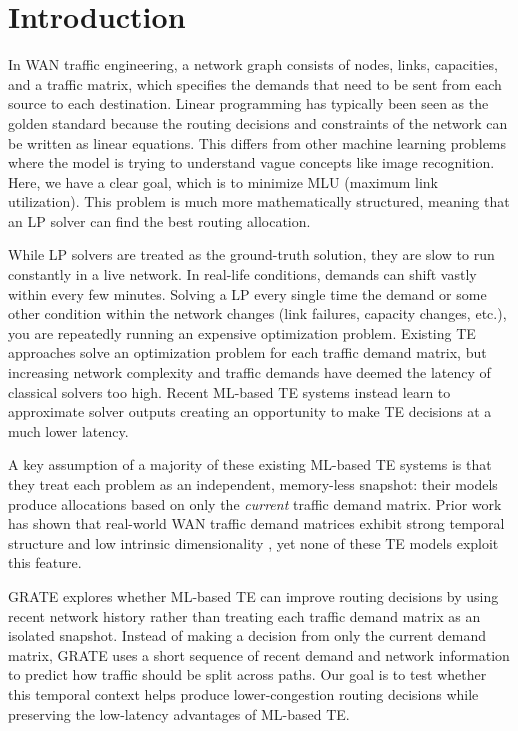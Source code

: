 \documentclass[letterpaper,twocolumn,10pt]{article}
\begin{document}
\section{Introduction}

In WAN traffic engineering, a network graph consists of nodes, links, capacities, and a traffic matrix, which specifies the demands that need to be sent from each source to each destination. Linear programming has typically been seen as the golden standard because the routing decisions and constraints of the network can be written as linear equations. This differs from other machine learning problems where the model is trying to understand vague concepts like image recognition. Here, we have a clear goal, which is to minimize MLU (maximum link utilization).  This problem is much more mathematically structured, meaning that an LP solver can find the best routing allocation. 

While LP solvers are treated as the ground-truth solution, they are slow to run constantly in a live network. In real-life conditions, demands can shift vastly within every few minutes. Solving a LP every single time the demand or some other condition within the network changes (link failures, capacity changes, etc.), you are repeatedly running an expensive optimization problem. Existing TE approaches solve an optimization problem for each traffic demand matrix, but increasing network complexity and traffic demands have deemed the latency of classical solvers too high. Recent ML-based TE systems instead learn to approximate solver outputs creating an opportunity to make TE decisions at a much lower latency.

A key assumption of a majority of these existing ML-based TE systems is that they treat each problem as an independent, memory-less snapshot: their models produce allocations based on only the \emph{current} traffic demand matrix. Prior work has shown that real-world WAN traffic demand matrices exhibit strong temporal structure and low intrinsic dimensionality \cite{lakhina2004structural}, 
yet none of these TE models exploit this feature.

GRATE explores whether ML-based TE can improve routing decisions by using recent network history rather than treating each traffic demand matrix as an isolated snapshot. Instead of making a decision from only the current demand matrix, GRATE uses a short sequence of recent demand and network information to predict how traffic should be split across paths. Our goal is to test whether this temporal context helps produce lower-congestion routing decisions while preserving the low-latency advantages of ML-based TE.
\end{document}

